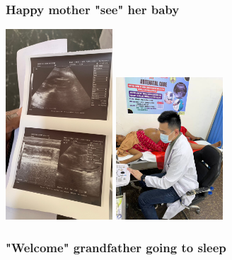 \documentclass[aspectratio=169]{beamer}
\begin{document}
\begin{frame}
\frametitle{Happy mother "see" her baby}
\begin{center}
    \includegraphics[width=0.3\textwidth, trim=00mm 100mm 00mm 60mm,clip]{IMG-5117.JPG} 
    \includegraphics[width=0.3\textwidth, trim=60mm 60mm 30mm 60mm,clip]{52165_antenatal_check.jpg}

\end{center}
\end{frame}

\begin{frame}
\frametitle{"Welcome" grandfather going to sleep}
\begin{center}

\end{center}
\end{frame}
\end{document}
